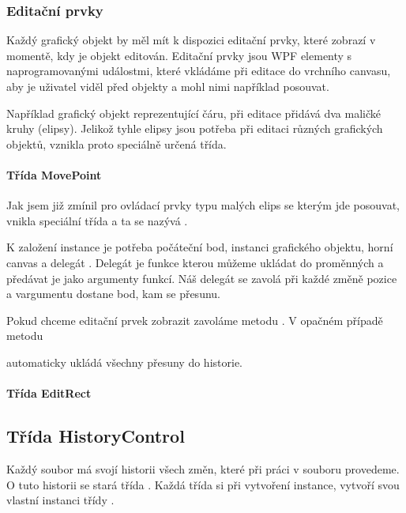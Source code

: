 \documentclass[
  field=inf,
  biblatex,
  glossaries,
  index
]{kidiplom}
\begin{document}
\subsubsection{Editační prvky}
Každý grafický objekt by měl mít k dispozici editační prvky, které zobrazí v momentě, kdy je objekt editován. Editační prvky jsou WPF elementy s naprogramovanými událostmi, které vkládáme při editace do vrchního canvasu, aby je uživatel viděl před objekty a mohl nimi například posouvat.

Například grafický objekt reprezentující čáru, při editace přidává dva maličké kruhy (elipsy). Jelikož tyhle elipsy jsou potřeba při editaci různých grafických objektů, vznikla proto speciálně určená třída.

\paragraph{Třída MovePoint}
Jak jsem již zmínil pro ovládací prvky typu malých elips se kterým jde posouvat, vnikla speciální třída a ta se nazývá .

K založení instance je potřeba počáteční bod, instanci grafického objektu, horní canvas a delegát . Delegát je funkce kterou můžeme ukládat do proměnných  a předávat je jako argumenty funkcí. Náš delegát se zavolá při každé změně pozice a vargumentu dostane bod, kam se přesunu.

Pokud chceme editační prvek zobrazit zavoláme metodu . V opačném případě metodu 

 automaticky ukládá všechny přesuny do historie.

\paragraph{Třída EditRect}


\subsection{Třída HistoryControl}

Každý soubor má svojí historii všech změn, které při práci v souboru provedeme. O tuto historii se stará třída . Každá třída  si při vytvoření instance, vytvoří svou vlastní instanci třídy .
\end{document}
